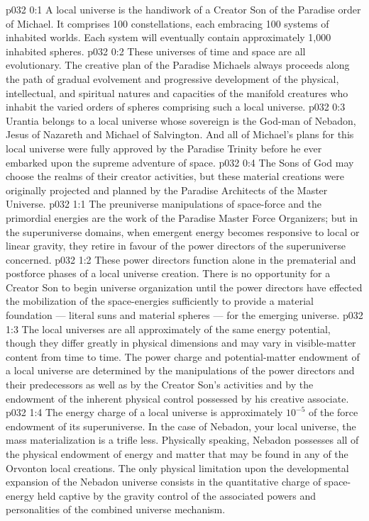 \author{Mighty Messenger}
\vs p032 0:1 A local universe is the handiwork of a Creator Son of the Paradise order of Michael. It comprises 100 constellations, each embracing 100 systems of inhabited worlds. Each system will eventually contain approximately 1,000 inhabited spheres.
\vs p032 0:2 These universes of time and space are all evolutionary. The creative plan of the Paradise Michaels always proceeds along the path of gradual evolvement and progressive development of the physical, intellectual, and spiritual natures and capacities of the manifold creatures who inhabit the varied orders of spheres comprising such a local universe.
\vs p032 0:3 Urantia belongs to a local universe whose sovereign is the God\hyp{}man of Nebadon, Jesus of Nazareth and Michael of Salvington. And all of Michael’s plans for this local universe were fully approved by the Paradise Trinity before he ever embarked upon the supreme adventure of space.
\vs p032 0:4 The Sons of God may choose the realms of their creator activities, but these material creations were originally projected and planned by the Paradise Architects of the Master Universe.
\vs p032 1:1 The preuniverse manipulations of space\hyp{}force and the primordial energies are the work of the Paradise Master Force Organizers; but in the superuniverse domains, when emergent energy becomes responsive to local or linear gravity, they retire in favour of the power directors of the superuniverse concerned.
\vs p032 1:2 These power directors function alone in the prematerial and postforce phases of a local universe creation. There is no opportunity for a Creator Son to begin universe organization until the power directors have effected the mobilization of the space\hyp{}energies sufficiently to provide a material foundation --- literal suns and material spheres --- for the emerging universe.
\vs p032 1:3 \pc The local universes are all approximately of the same energy potential, though they differ greatly in physical dimensions and may vary in visible\hyp{}matter content from time to time. The power charge and potential\hyp{}matter endowment of a local universe are determined by the manipulations of the power directors and their predecessors as well as by the Creator Son’s activities and by the endowment of the inherent physical control possessed by his creative associate.
\vs p032 1:4 The energy charge of a local universe is approximately $10^{-5}$ of the force endowment of its superuniverse. In the case of Nebadon, your local universe, the mass materialization is a trifle less. Physically speaking, Nebadon possesses all of the physical endowment of energy and matter that may be found in any of the Orvonton local creations. The only physical limitation upon the developmental expansion of the Nebadon universe consists in the quantitative charge of space\hyp{}energy held captive by the gravity control of the associated powers and personalities of the combined universe mechanism.
